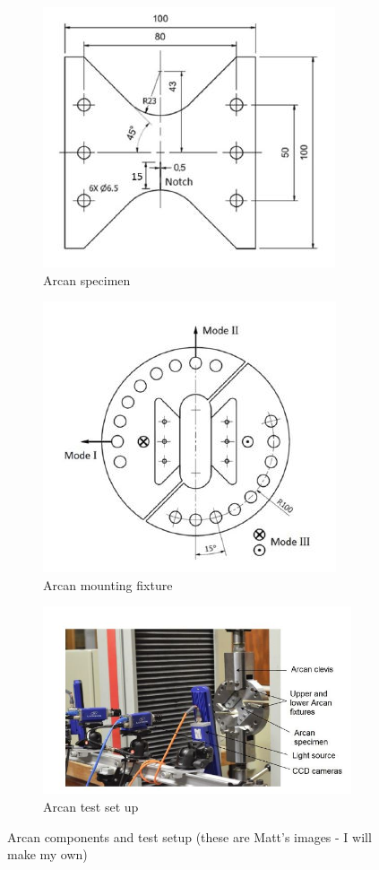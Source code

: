 \documentclass[12pt,oneside,openany,a4paper, %
english, %
masters-t, goldenblock]{usthesis}
\begin{document}
\begin{figure}[H]
\centering
\begin{subfigure}[t]{0.45\textwidth}
\centering
\includegraphics[scale=0.8]{arcan specimen}
\caption{Arcan specimen}
\label{fig: arcan specimen}
\end{subfigure}
\hfill
\begin{subfigure}[t]{0.45\textwidth}
\centering
\includegraphics[scale=0.8]{arcan fixture}
\caption{Arcan mounting fixture}
\label{fig: arcan fixture}
\end{subfigure}

\begin{subfigure}[t]{0.45\textwidth}
\centering
\includegraphics[scale=0.6]{arcan setup}
\caption{Arcan test set up}
\label{fig: arcan setup}
\end{subfigure}
\caption{Arcan components and test setup (these are Matt's images - I will make my own)}
\label{fig: arcan full image}
\end{figure}
\end{document}
